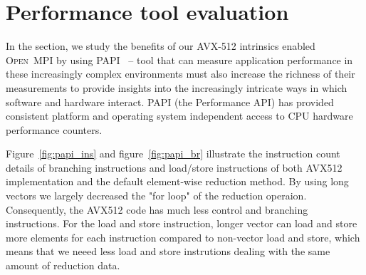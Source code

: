 \documentclass[sigconf]{acmart}
\newcommand{\ompi}[0]{\textsc{Open~MPI}\xspace}
\begin{document}
\section{Performance tool evaluation}\label{sec:perf}
In the section, we study the benefits of our AVX-512 intrinsics enabled \ompi by using PAPI~\cite{papi} -- tool that can measure application performance in these increasingly complex environments must also increase the richness of their measurements to provide insights into the increasingly intricate ways in which software and hardware interact.
PAPI (the Performance API) has provided consistent platform and operating system independent access to CPU hardware performance counters.

Figure~\ref{fig:papi_ins} and figure~\ref{fig:papi_br} illustrate the instruction count details
of branching instructions and load/store instructions of both AVX512 implementation and the default
element-wise reduction method. By using long vectors we largely decreased the "for loop" of the reduction
operaion. Consequently, the AVX512 code has much less control and branching instructions. For the load and store
instruction, longer vector can load and store more elements for each instruction compared to non-vector load and store, which means that we neeed less load and store instrutions dealing with the same amount of reduction data.


\end{document}

